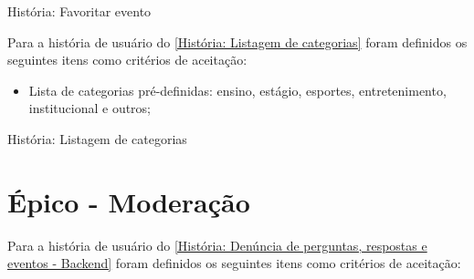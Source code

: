 \def\arraystretch{2}
\begin{quadro}[htb]
\centering
\ABNTEXfontereduzida
\caption[História: Favoritar evento]{História: Favoritar evento}
\label{História: Favoritar evento}
\end{quadro}
\FloatBarrier 

Para a história de usuário do \autoref{História: Listagem de categorias} foram definidos os seguintes itens como critérios de aceitação:

\begin{itemize}
\item Lista de categorias pré-definidas: ensino, estágio, esportes, entretenimento, institucional e outros;  
\end{itemize}

\def\arraystretch{2}
\begin{quadro}[htb]
\centering
\ABNTEXfontereduzida
\caption[História: Listagem de categorias]{História: Listagem de categorias}
\label{História: Listagem de categorias}
\end{quadro}
\FloatBarrier 

\section{Épico - Moderação}
\label{gestão_moderacao}
Para a história de usuário do \autoref{História: Denúncia de perguntas, respostas e eventos - Backend} foram definidos os seguintes itens como critérios de aceitação:

